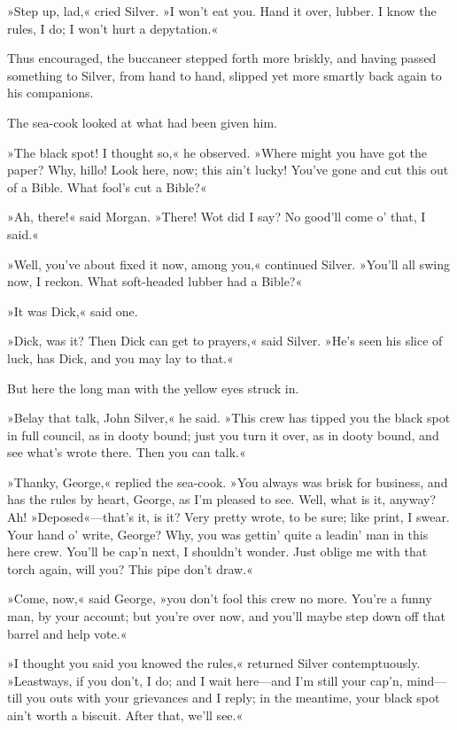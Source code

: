 »Step up, lad,« cried Silver. »I won't eat you. Hand it over, lubber. I know the rules, I do; I won't hurt a depytation.«

Thus encouraged, the buccaneer stepped forth more briskly, and having passed something to Silver, from hand to hand, slipped yet more smartly back again to his companions.

The sea-cook looked at what had been given him.

»The black spot! I thought so,« he observed. »Where might you have got the paper? Why, hillo! Look here, now; this ain't lucky! You've gone and cut this out of a Bible. What fool's cut a Bible?«

»Ah, there!« said Morgan. »There! Wot did I say? No good'll come o' that, I said.«

»Well, you've about fixed it now, among you,« continued Silver. »You'll all swing now, I reckon. What soft-headed lubber had a Bible?«

»It was Dick,« said one.

»Dick, was it? Then Dick can get to prayers,« said Silver. »He's seen his slice of luck, has Dick, and you may lay to that.«

But here the long man with the yellow eyes struck in.

»Belay that talk, John Silver,« he said. »This crew has tipped you the black spot in full council, as in dooty bound; just you turn it over, as in dooty bound, and see what's wrote there. Then you can talk.«

»Thanky, George,« replied the sea-cook. »You always was brisk for business, and has the rules by heart, George, as I'm pleased to see. Well, what is it, anyway? Ah! »Deposed«—that's it, is it? Very pretty wrote, to be sure; like print, I swear. Your hand o' write, George? Why, you was gettin' quite a leadin' man in this here crew. You'll be cap'n next, I shouldn't wonder. Just oblige me with that torch again, will you? This pipe don't draw.«

»Come, now,« said George, »you don't fool this crew no more. You're a funny man, by your account; but you're over now, and you'll maybe step down off that barrel and help vote.«

»I thought you said you knowed the rules,« returned Silver contemptuously. »Leastways, if you don't, I do; and I wait here—and I'm still your cap'n, mind—till you outs with your grievances and I reply; in the meantime, your black spot ain't worth a biscuit. After that, we'll see.«

